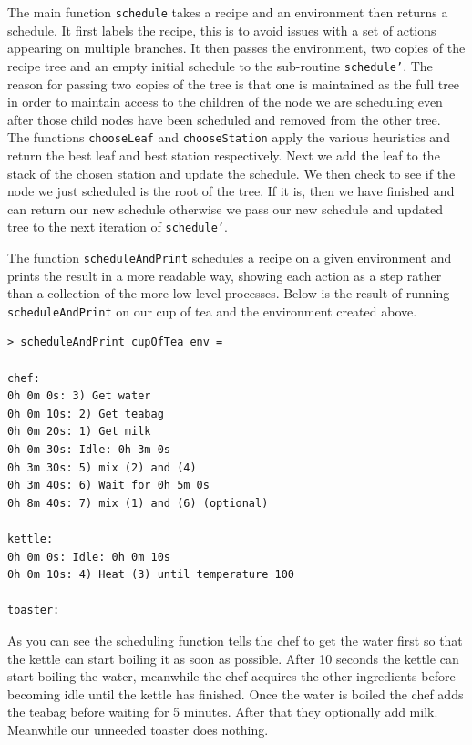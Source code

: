 \documentclass[11pt]{article}
\begin{document}
The main function \texttt{schedule} takes a recipe and an environment then returns a schedule.
It first labels the recipe, this is to avoid issues with a set of actions appearing on multiple
branches. It then passes the environment, two copies of the recipe tree and an empty initial
schedule to the sub-routine \texttt{schedule'}. The reason for passing two copies of the tree
is that one is maintained as the full tree in order to maintain access to the children of the
node we are scheduling even after those child nodes have been scheduled and removed from the other
tree. The functions \texttt{chooseLeaf} and \texttt{chooseStation} apply the various heuristics
and return the best leaf and best station respectively. Next we add the leaf to the stack of
the chosen station and update the schedule. We then check to see if the node we just
scheduled is the root of the tree. If it is, then we have finished and can return our new schedule
otherwise we pass our new schedule and updated tree to the next iteration of \texttt{schedule'}.

\medbreak

The function \texttt{scheduleAndPrint} schedules a recipe on a given environment
and prints the result in a more readable way, showing each action as a step rather
than a collection of the more low level processes. Below is the result of running
\texttt{scheduleAndPrint} on our cup of tea and the environment created above.

\begin{lstlisting}
> scheduleAndPrint cupOfTea env = 

chef:
0h 0m 0s: 3) Get water
0h 0m 10s: 2) Get teabag
0h 0m 20s: 1) Get milk
0h 0m 30s: Idle: 0h 3m 0s
0h 3m 30s: 5) mix (2) and (4)
0h 3m 40s: 6) Wait for 0h 5m 0s
0h 8m 40s: 7) mix (1) and (6) (optional)

kettle:
0h 0m 0s: Idle: 0h 0m 10s
0h 0m 10s: 4) Heat (3) until temperature 100

toaster:
\end{lstlisting}

As you can see the scheduling function tells the chef to get the water first so that the
kettle can start boiling it as soon as possible. After 10 seconds the kettle can start
boiling the water, meanwhile the chef acquires the other ingredients before becoming idle
until the kettle has finished. Once the water is boiled the chef adds the teabag before
waiting for 5 minutes. After that they optionally add milk. Meanwhile our unneeded toaster
does nothing.
\end{document}
